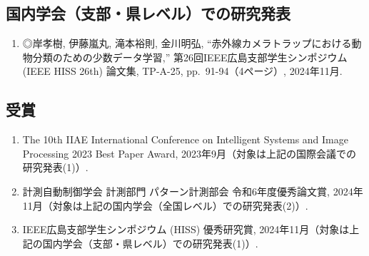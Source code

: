 \subsection*{国内学会（支部・県レベル）での研究発表}
\begin{enumerate}
  \item ◎岸孝樹, 伊藤嵐丸, 滝本裕則, 金川明弘, ``赤外線カメラトラップにおける動物分類のための少数データ学習,'' 第26回IEEE広島支部学生シンポジウム (IEEE HISS 26th) 論文集, TP-A-25, pp.~91-94（4ページ）, 2024年11月.
\end{enumerate}

\subsection*{受賞}
\begin{enumerate}
  \item The 10th IIAE International Conference on Intelligent Systems and Image Processing 2023 Best Paper Award, 2023年9月（対象は上記の国際会議での研究発表(1)）.
  \item 計測自動制御学会 計測部門 パターン計測部会 令和6年度優秀論文賞, 2024年11月（対象は上記の国内学会（全国レベル）での研究発表(2)）.
  \item IEEE広島支部学生シンポジウム (HISS) 優秀研究賞, 2024年11月（対象は上記の国内学会（支部・県レベル）での研究発表(1)）.
\end{enumerate}